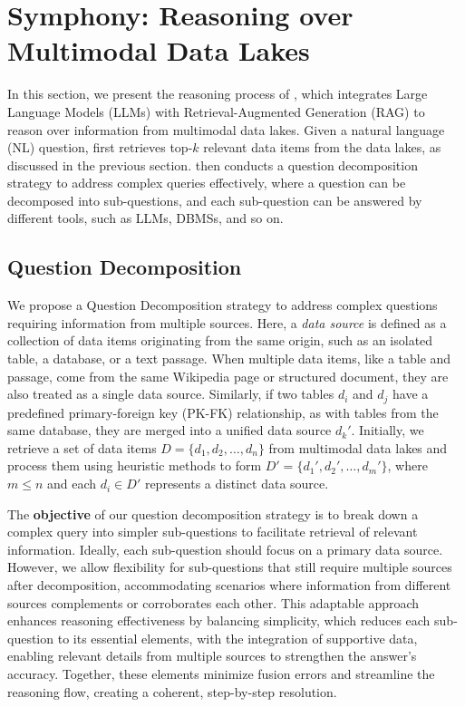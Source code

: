 \section{Symphony: Reasoning over Multimodal Data Lakes}
\label{sec:reasoning}



In this section, we present the reasoning process of \sys, which integrates Large Language Models (LLMs) with Retrieval-Augmented Generation (RAG) to reason over information from multimodal data lakes. Given a natural language (NL) question, \sys first retrieves top-$k$ relevant data items from the data lakes, as discussed in the previous section. 
%
\sys then conducts a question decomposition strategy to address complex queries effectively, where a question can be decomposed into sub-questions, and each sub-question can be answered by different tools, such as LLMs, DBMSs, and so on. 



\subsection{Question Decomposition}

We propose a Question Decomposition strategy to address complex questions requiring information from multiple sources. Here, a \textit{data source} is defined as a collection of data items originating from the same origin, such as an isolated table, a database, or a text passage. When multiple data items, like a table and passage, come from the same Wikipedia page or structured document, they are also treated as a single data source. Similarly, if two tables \(d_i\) and \(d_j\) have a predefined primary-foreign key (PK-FK) relationship, as with tables from the same database, they are merged into a unified data source \(d_k'\). Initially, we retrieve a set of data items \(D = \{d_1, d_2, \ldots, d_n\}\) from multimodal data lakes and process them using heuristic methods to form \(D' = \{d_1', d_2', \ldots, d_m'\}\), where $m \leq n$ and each \(d_i \in D'\) represents a distinct data source.

The \textbf{objective} of our question decomposition strategy is to break down a complex query into simpler sub-questions to facilitate retrieval of relevant information. Ideally, each sub-question should focus on a primary data source. However, we allow flexibility for sub-questions that still require multiple sources after decomposition, accommodating scenarios where information from different sources complements or corroborates each other. This adaptable approach enhances reasoning effectiveness by balancing simplicity, which reduces each sub-question to its essential elements, with the integration of supportive data, enabling relevant details from multiple sources to strengthen the answer's accuracy. Together, these elements minimize fusion errors and streamline the reasoning flow, creating a coherent, step-by-step resolution.

